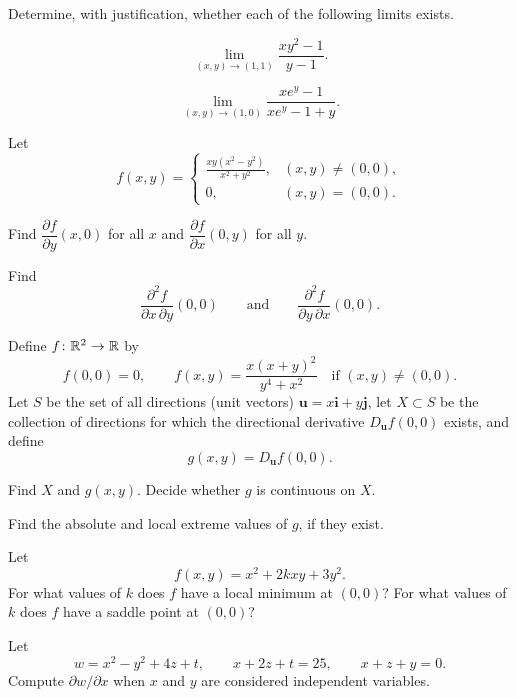 \begin{problem}
Determine, with justification, whether each of the following limits exists.
\begin{problemsubparts}
\item
\[
\lim_{(x, y)\to(1, 1)}\frac{xy^2-1}{y-1}.
\]
\item
\[
\lim_{(x, y)\to(1, 0)}\frac{xe^y-1}{xe^y-1+y}.
\]
\end{problemsubparts}
\end{problem}

\begin{problem}
Let
\[
f(x, y)=
\begin{cases}
\displaystyle\frac{xy(x^2-y^2)}{x^2+y^2}, & (x, y)\ne(0, 0), \\[0.6em]
0, & (x, y)=(0, 0).
\end{cases}
\]
\begin{problemsubparts}
\item Find $\dfrac{\partial f}{\partial y}(x, 0)$ for all $x$ and $\dfrac{\partial f}{\partial x}(0, y)$ for all $y$.
\item Find
\[
\frac{\partial^2 f}{\partial x\,\partial y}(0, 0)
\qquad\text{and}\qquad
\frac{\partial^2 f}{\partial y\,\partial x}(0, 0).
\]
\end{problemsubparts}
\end{problem}

\begin{problem}
Define $f\colon\mathbb{R}^2\to\mathbb{R}$ by
\[
f(0, 0)=0,
\qquad
f(x, y)=\frac{x(x+y)^2}{y^4+x^2}
\quad\text{if }(x, y)\ne(0, 0).
\]
Let $S$ be the set of all directions (unit vectors) $\mathbf u=x\mathbf i+y\mathbf j$, let $X\subset S$ be the collection of directions for which the directional derivative $D_{\mathbf u}f(0, 0)$ exists, and define
\[
g(x, y)=D_{\mathbf u}f(0, 0).
\]
\begin{problemsubparts}
\item Find $X$ and $g(x, y)$. Decide whether $g$ is continuous on $X$.
\item Find the absolute and local extreme values of $g$, if they exist.
\end{problemsubparts}
\end{problem}

\begin{problem}
\begin{problemsubparts}
\item Let
\[
f(x, y)=x^2+2kxy+3y^2.
\]
For what values of $k$ does $f$ have a local minimum at $(0, 0)$? For what values of $k$ does $f$ have a saddle point at $(0, 0)$?
\item Let
\[
w=x^2-y^2+4z+t,
\qquad
x+2z+t=25,
\qquad
x+z+y=0.
\]
Compute $\partial w/\partial x$ when $x$ and $y$ are considered independent variables.
\end{problemsubparts}
\end{problem}

